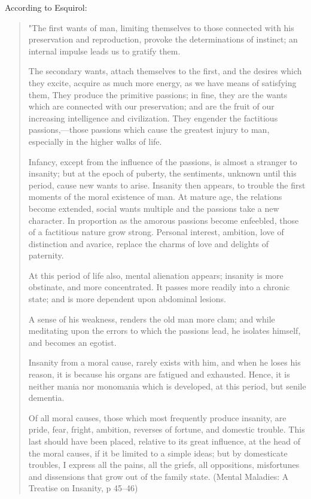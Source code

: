 According to Esquirol:

\begin{quote}

"The first wants of man, limiting themselves to those connected with his preservation and reproduction, provoke the determinations of instinct; an internal impulse leads us to gratify them.

The secondary wants, attach themselves to the first, and the desires which they excite, acquire as much more energy, as we have means of satisfying them, They produce the primitive passions; in fine, they are the wants which are connected with our preservation; and are the fruit of our increasing intelligence and civilization. They engender the factitious passions,---those passions which cause the greatest injury to man, especially in the higher walks of life.

Infancy, except from the influence of the passions, is almost a stranger to insanity; but at the epoch of puberty, the sentiments, unknown until this period, cause new wants to arise. Insanity then appears, to trouble the first moments of the moral existence of man.
At mature age, the relations become extended, social wants multiple and the passions take a new character. In proportion as the amorous passions become enfeebled, those of a factitious nature grow strong. Personal interest, ambition, love of distinction and avarice, replace the charms of love and delights of paternity.

At this period of life also, mental alienation appears; insanity is more obstinate, and more concentrated. It passes more readily into a chronic state; and is more dependent upon abdominal lesions.

A sense of his weakness, renders the old man more clam; and while meditating upon the errors to which the passions lead, he isolates himself, and becomes an egotist.

Insanity from a moral cause, rarely exists with him, and when he loses his reason, it is because his organs are fatigued and exhausted. Hence, it is neither mania nor monomania which is developed, at this period, but senile dementia.

Of all moral causes, those which most frequently produce insanity, are pride, fear, fright, ambition, reverses of fortune, and domestic trouble. This last should have been placed, relative to its great influence, at the head of the moral causes, if it be limited to a simple ideas; but by domesticate troubles, I express all the pains, all the griefs, all oppositions, misfortunes and dissensions that grow out of the family state.
(Mental Maladies: A Treatise on Insanity, p 45--46)
\end{quote}

